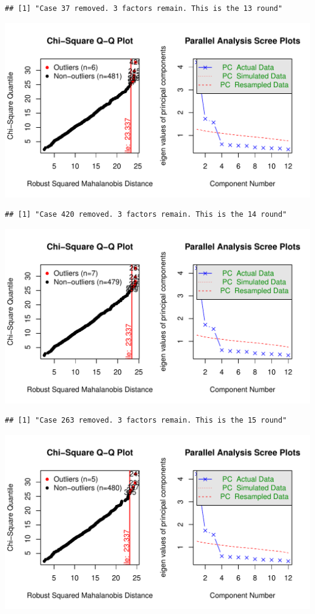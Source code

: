 \documentclass{article}\usepackage[]{graphicx}\usepackage[]{color}
\makeatletter
\def\maxwidth{ %
  \ifdim\Gin@nat@width>\linewidth
    \linewidth
  \else
    \Gin@nat@width
  \fi
}
\newenvironment{kframe}{%
 \def\at@end@of@kframe{}%
 \ifinner\ifhmode%
  \def\at@end@of@kframe{\end{minipage}}%
  \begin{minipage}{\columnwidth}%
 \fi\fi%
 \def\FrameCommand##1{\hskip\@totalleftmargin \hskip-\fboxsep
 \colorbox{shadecolor}{##1}\hskip-\fboxsep
     \hskip-\linewidth \hskip-\@totalleftmargin \hskip\columnwidth}%
 \MakeFramed {\advance\hsize-\width
   \@totalleftmargin\z@ \linewidth\hsize
   \@setminipage}}%
 {\par\unskip\endMakeFramed%
 \at@end@of@kframe}
\newenvironment{knitrout}{}{} %
\makeatother
\begin{document}
\begin{knitrout}
\begin{kframe}\begin{verbatim}
## [1] "Case 37 removed. 3 factors remain. This is the 13 round"
\end{verbatim}
\end{kframe}
\includegraphics[width=\maxwidth]{figure/unnamed-chunk-10-14} 
\begin{kframe}\begin{verbatim}
## [1] "Case 420 removed. 3 factors remain. This is the 14 round"
\end{verbatim}
\end{kframe}
\includegraphics[width=\maxwidth]{figure/unnamed-chunk-10-15} 
\begin{kframe}\begin{verbatim}
## [1] "Case 263 removed. 3 factors remain. This is the 15 round"
\end{verbatim}
\end{kframe}
\includegraphics[width=\maxwidth]{figure/unnamed-chunk-10-16} 

\end{knitrout}
\end{document}
